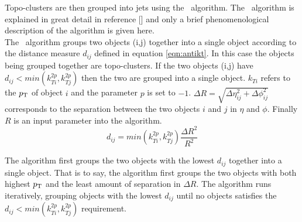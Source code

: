 
\indent Topo-clusters are then grouped into jets using the \antikt\ algorithm.  The \antikt\ algorithm is explained in great detail in reference [\cite{antikt}] and only a brief phenomenological description of the algorithm is given here. \\

\indent The \antikt\ algorithm groups two objects (i,j) together into a single object according to the distance measure $d_{ij}$ defined in equation \ref{eqn:antikt}.  In this case the objects being grouped together are topo-clusters.  If the two objects (i,j) have $d_{ij} < min ( k^{2p}_{Ti}, k^{2p}_{Tj} )$ then the two are grouped into a single object.  $k_{Ti}$ refers to the $p_{\mathrm{T}}$ of object $i$ and the parameter $p$ is set to $-1$. $\Delta R = \sqrt{\Delta\eta^2_{ij} + \Delta\phi^2_{ij}}$ corresponds to the separation between the two objects $i$ and $j$ in $\eta$ and $\phi$. Finally $R$ is an input parameter into the algorithm.\\ 

\begin{equation}
d_{ij} = min ( k^{2p}_{Ti}, k^{2p}_{Tj} ) \frac{\Delta R^2}{R^2}
\label{eqn:antikt}
\end{equation}

\indent  The algorithm first groups the two objects with the lowest $d_{ij}$ together into a single object. That is to say, the algorithm first groups the two objects with both highest $p_{\mathrm{T}}$ and the least amount of separation in $\Delta R$.  The algorithm runs iteratively, grouping objects with the lowest $d_{ij}$ until no objects satisfies the $d_{ij} < min ( k^{2p}_{Ti}, k^{2p}_{Tj} )$ requirement. \\


